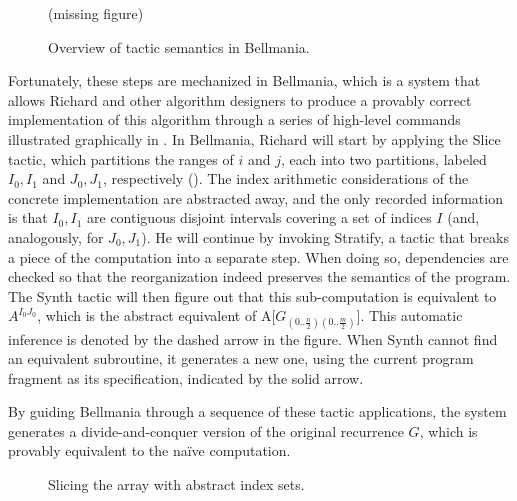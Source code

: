 \begin{figure}
\centering
\ifarmando
\bigskip(missing figure)\bigskip
\else

\fi
\caption[caption]{\label{overview:slice-stratify-synth}
  Overview of tactic semantics in Bellmania. }
\end{figure}


Fortunately, these steps are mechanized in Bellmania, which is a system that allows
Richard and other algorithm designers to produce a provably
correct implementation of this algorithm through a series of high-level commands
illustrated graphically in .
In Bellmania, Richard will start by applying the {\sf Slice} tactic, which
partitions the ranges of $i$ and $j$, each into two partitions, labeled
$I_0,I_1$ and $J_0,J_1$, respectively (). The index arithmetic considerations of
the concrete implementation are abstracted away, and the only recorded information
is that $I_0,I_1$ are contiguous disjoint intervals covering a set of indices $I$
(and, analogously, for $J_0,J_1$). He will continue by invoking {\sf Stratify},
a tactic that breaks a piece of the computation into a separate step.
When doing so, dependencies are checked so that the reorganization indeed
preserves the semantics of the program. The {\sf Synth} tactic will then figure
out that this sub-computation is equivalent to $A^{I_0J_0}$, which is the
abstract equivalent of {A{[}$G_{(0..\frac{n}{2})(0..\frac{m}{2})}${]}}.
This automatic inference is denoted by the dashed arrow in the figure.
When {\sf Synth} cannot find an equivalent subroutine, it generates a new one,
using the current program fragment as its specification, indicated by the solid arrow.

By guiding Bellmania through a sequence of these tactic applications, the system
generates a divide-and-conquer version of the original recurrence $G$, which is
provably equivalent to the na\"ive computation.

\begin{figure}
\centering
{}
\caption{\label{overview:quadrants-abstract}
  Slicing the array with abstract index sets.}
\end{figure}


